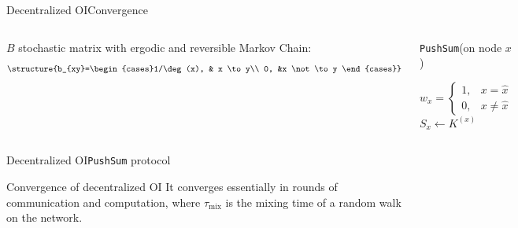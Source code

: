 \documentclass[xcolor=table,final]{beamer} %
\newcommand{\PushSum}{\texttt{PushSum}\xspace}
\begin{document}
\begin{frame}{Decentralized OI}{Convergence}
  \begin{columns}
    $B$ stochastic matrix with ergodic and reversible Markov Chain:
    \begin{equation*}
      \structure{b_{xy}=\begin{cases}1/\deg(x), & x \to y\\ 0, &x \not\to y \end{cases}}
    \end{equation*}

    \begin{block}{\PushSum  (on node $x$)}
      \begin{algorithm}[H]
        \BlankLine

        $w_x=\begin{cases}1, & x = \hat{x} \\ 0, & x \neq \hat{x} \end{cases}$ \;
        $S_x \gets K^{(x)}$ \;

      \end{algorithm}
    \end{block}
  \end{columns}
\end{frame}

\begin{frame}{Decentralized OI}{\PushSum protocol}
  \begin{block}{Convergence of decentralized OI}
    It converges essentially in
    rounds of communication and computation, 
    where $\tau_{\text{mix}}$ is the mixing  time  of  a  random  walk  on  the  network. 
  \end{block}
\end{frame}
\end{document}
